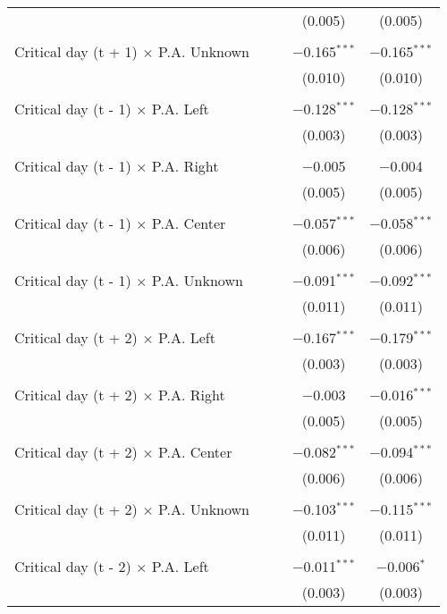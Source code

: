 \documentclass[
]{article}
\begin{document}
\begin{table}[!htbp]
{\begin{tabular}{@{\extracolsep{5pt}}lcccc}
  &  &  & (0.005) & (0.005) \\ 
  & & & & \\ 
 Critical day (t + 1) $\times$ P.A. Unknown &  &  & $-$0.165$^{***}$ & $-$0.165$^{***}$ \\ 
  &  &  & (0.010) & (0.010) \\ 
  & & & & \\ 
 Critical day (t - 1) $\times$ P.A. Left &  &  & $-$0.128$^{***}$ & $-$0.128$^{***}$ \\ 
  &  &  & (0.003) & (0.003) \\ 
  & & & & \\ 
 Critical day (t - 1) $\times$ P.A. Right &  &  & $-$0.005 & $-$0.004 \\ 
  &  &  & (0.005) & (0.005) \\ 
  & & & & \\ 
 Critical day (t - 1) $\times$ P.A. Center &  &  & $-$0.057$^{***}$ & $-$0.058$^{***}$ \\ 
  &  &  & (0.006) & (0.006) \\ 
  & & & & \\ 
 Critical day (t - 1) $\times$ P.A. Unknown &  &  & $-$0.091$^{***}$ & $-$0.092$^{***}$ \\ 
  &  &  & (0.011) & (0.011) \\ 
  & & & & \\ 
 Critical day (t + 2) $\times$ P.A. Left &  &  & $-$0.167$^{***}$ & $-$0.179$^{***}$ \\ 
  &  &  & (0.003) & (0.003) \\ 
  & & & & \\ 
 Critical day (t + 2) $\times$ P.A. Right &  &  & $-$0.003 & $-$0.016$^{***}$ \\ 
  &  &  & (0.005) & (0.005) \\ 
  & & & & \\ 
 Critical day (t + 2) $\times$ P.A. Center &  &  & $-$0.082$^{***}$ & $-$0.094$^{***}$ \\ 
  &  &  & (0.006) & (0.006) \\ 
  & & & & \\ 
 Critical day (t + 2) $\times$ P.A. Unknown &  &  & $-$0.103$^{***}$ & $-$0.115$^{***}$ \\ 
  &  &  & (0.011) & (0.011) \\ 
  & & & & \\ 
 Critical day (t - 2) $\times$ P.A. Left &  &  & $-$0.011$^{***}$ & $-$0.006$^{*}$ \\ 
  &  &  & (0.003) & (0.003) \\ 

\end{tabular}}
\end{table}
\end{document}
